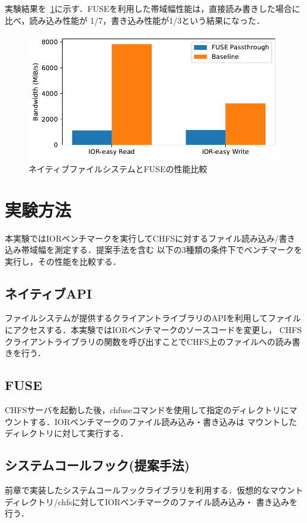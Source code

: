\documentclass[a4paper,11pt]{jreport}
\begin{document}
実験結果を\figurename~\ref{fig:FUSE Performance}に示す．FUSEを利用した帯域幅性能は，直接読み書きした場合に比べ，読み込み性能が
1/7，書き込み性能が1/3という結果になった．

\newpage

\begin{figure}[h]
	\begin{minipage}[b]{1\columnwidth}
		\centering
		\includegraphics[width=0.9\linewidth]{./figure/fuse_overhead.ssd.pdf}
		\caption{ネイティブファイルシステムとFUSEの性能比較}
		\label{fig:FUSE Performance}
	\end{minipage}
\end{figure}
\section{実験方法}
本実験ではIORベンチマークを実行してCHFSに対するファイル読み込み/書き込み帯域幅を測定する．提案手法を含む
以下の3種類の条件下でベンチマークを実行し，その性能を比較する．

\subsection{ネイティブAPI}
ファイルシステムが提供するクライアントライブラリのAPIを利用してファイルにアクセスする．本実験ではIORベンチマークのソースコードを変更し，
CHFSクライアントライブラリの関数を呼び出すことでCHFS上のファイルへの読み書きを行う．
\subsection{FUSE}
CHFSサーバを起動した後，chfuseコマンドを使用して指定のディレクトリにマウントする．IORベンチマークのファイル読み込み・書き込みは
マウントしたディレクトリに対して実行する．
\subsection{システムコールフック(提案手法)}
前章で実装したシステムコールフックライブラリを利用する．仮想的なマウントディレクトリ/chfsに対してIORベンチマークのファイル読み込み・
書き込みを行う．
\end{document}
